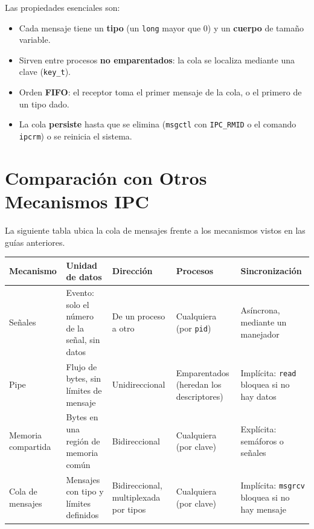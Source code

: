 \documentclass[12pt,a4paper]{article}
\begin{document}
Las propiedades esenciales son:
\begin{itemize}
    \item Cada mensaje tiene un \textbf{tipo} (un \texttt{long} mayor que $0$) y un \textbf{cuerpo} de tamaño variable.
    \item Sirven entre procesos \textbf{no emparentados}: la cola se localiza mediante una clave (\texttt{key\_t}).
    \item Orden \textbf{FIFO}: el receptor toma el primer mensaje de la cola, o el primero de un tipo dado.
    \item La cola \textbf{persiste} hasta que se elimina (\texttt{msgctl} con \texttt{IPC\_RMID} o el comando \texttt{ipcrm}) o se reinicia el sistema.
\end{itemize}

\section{Comparación con Otros Mecanismos IPC}
La siguiente tabla ubica la cola de mensajes frente a los mecanismos vistos en las guías anteriores.

\begin{table}[h]
\centering
\footnotesize
\setlength{\tabcolsep}{4pt}
\begin{tabular}{|>{\raggedright\arraybackslash}p{2.0cm}|>{\raggedright\arraybackslash}p{3.2cm}|>{\raggedright\arraybackslash}p{2.5cm}|>{\raggedright\arraybackslash}p{2.6cm}|>{\raggedright\arraybackslash}p{3.1cm}|}
\hline
\textbf{Mecanismo} & \textbf{Unidad de datos} & \textbf{Dirección} & \textbf{Procesos} & \textbf{Sincronización} \\ \hline
Señales & Evento: solo el número de la señal, sin datos & De un proceso a otro & Cualquiera (por \texttt{pid}) & Asíncrona, mediante un manejador \\ \hline
Pipe & Flujo de bytes, sin límites de mensaje & Unidireccional & Emparentados (heredan los descriptores) & Implícita: \texttt{read} bloquea si no hay datos \\ \hline
Memoria compartida & Bytes en una región de memoria común & Bidireccional & Cualquiera (por clave) & Explícita: semáforos o señales \\ \hline
Cola de mensajes & Mensajes con tipo y límites definidos & Bidireccional, multiplexada por tipos & Cualquiera (por clave) & Implícita: \texttt{msgrcv} bloquea si no hay mensaje \\ \hline
\end{tabular}
\end{table}
\end{document}
